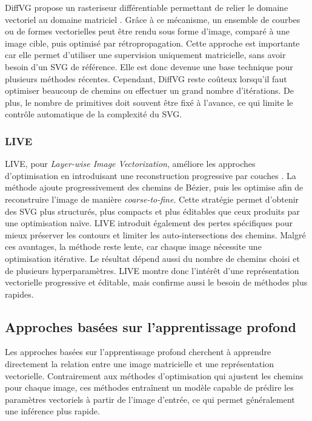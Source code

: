\documentclass[12pt, a4paper, oneside]{report}
\begin{document}
DiffVG propose un rasteriseur différentiable permettant de relier le domaine vectoriel au domaine matriciel \cite{li2020diffvg}. Grâce à ce mécanisme, un ensemble de courbes ou de formes vectorielles peut être rendu sous forme d'image, comparé à une image cible, puis optimisé par rétropropagation. Cette approche est importante car elle permet d'utiliser une supervision uniquement matricielle, sans avoir besoin d'un SVG de référence. Elle est donc devenue une base technique pour plusieurs méthodes récentes. Cependant, DiffVG reste coûteux lorsqu'il faut optimiser beaucoup de chemins ou effectuer un grand nombre d'itérations. De plus, le nombre de primitives doit souvent être fixé à l'avance, ce qui limite le contrôle automatique de la complexité du SVG.

        \subsubsection{LIVE}

LIVE, pour \textit{Layer-wise Image Vectorization}, améliore les approches d'optimisation en introduisant une reconstruction progressive par couches \cite{ma2022live}. La méthode ajoute progressivement des chemins de Bézier, puis les optimise afin de reconstruire l'image de manière \textit{coarse-to-fine}. Cette stratégie permet d'obtenir des SVG plus structurés, plus compacts et plus éditables que ceux produits par une optimisation naïve. LIVE introduit également des pertes spécifiques pour mieux préserver les contours et limiter les auto-intersections des chemins. Malgré ces avantages, la méthode reste lente, car chaque image nécessite une optimisation itérative. Le résultat dépend aussi du nombre de chemins choisi et de plusieurs hyperparamètres. LIVE montre donc l'intérêt d'une représentation vectorielle progressive et éditable, mais confirme aussi le besoin de méthodes plus rapides.

    \subsection{Approches basées sur l'apprentissage profond}

Les approches basées sur l'apprentissage profond cherchent à apprendre directement la relation entre une image matricielle et une représentation vectorielle. Contrairement aux méthodes d'optimisation qui ajustent les chemins pour chaque image, ces méthodes entraînent un modèle capable de prédire les paramètres vectoriels à partir de l'image d'entrée, ce qui permet généralement une inférence plus rapide.
\end{document}
